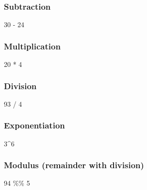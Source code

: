 \documentclass[
  letterpaper,
  DIV=11,
  numbers=noendperiod]{scrreprt}
\newenvironment{Shaded}{}{}
\newcommand{\DecValTok}[1]{\textcolor[rgb]{0.00,0.36,0.77}{#1}}
\newcommand{\SpecialCharTok}[1]{\textcolor[rgb]{0.00,0.36,0.77}{#1}}
\begin{document}
\subsubsection{Subtraction}\label{subtraction}

\begin{Shaded}
\begin{Highlighting}[]
\DecValTok{30} \SpecialCharTok{{-}} \DecValTok{24}
\end{Highlighting}
\end{Shaded}

\subsubsection{Multiplication}\label{multiplication}

\begin{Shaded}
\begin{Highlighting}[]
\DecValTok{20} \SpecialCharTok{*} \DecValTok{4}
\end{Highlighting}
\end{Shaded}

\subsubsection{Division}\label{division}

\begin{Shaded}
\begin{Highlighting}[]
\DecValTok{93} \SpecialCharTok{/} \DecValTok{4}
\end{Highlighting}
\end{Shaded}

\subsubsection{Exponentiation}\label{exponentiation}

\begin{Shaded}
\begin{Highlighting}[]
\DecValTok{3}\SpecialCharTok{\^{}}\DecValTok{6}
\end{Highlighting}
\end{Shaded}

\subsubsection{Modulus (remainder with
division)}\label{modulus-remainder-with-division}

\begin{Shaded}
\begin{Highlighting}[]
\DecValTok{94} \SpecialCharTok{\%\%} \DecValTok{5}
\end{Highlighting}
\end{Shaded}
\end{document}
